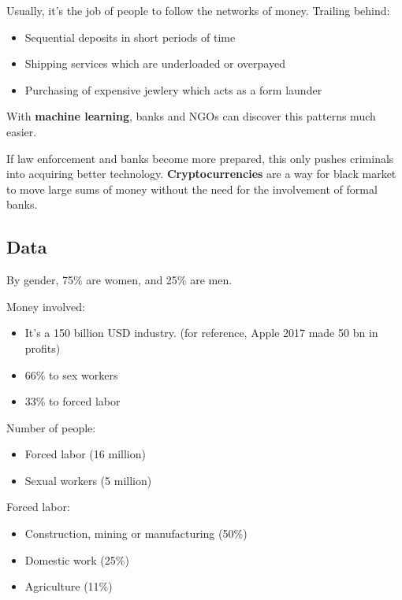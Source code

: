 	Usually, it's the job of people to follow the networks of money. Trailing behind:
	\begin{itemize}
		\item Sequential deposits in short periods of time
		\item Shipping services which are underloaded or overpayed
		\item Purchasing of expensive jewlery which acts as a form launder
	\end{itemize}

	With \textbf{machine learning}, banks and NGOs can discover this patterns much easier.

	If law enforcement and banks become more prepared, this only pushes criminals into acquiring better technology. \textbf{Cryptocurrencies} are a way for black market to move large sums of money without the need for the involvement of formal banks. 






\subsection{Data} 

	By gender, 75\% are women, and 25\% are men.

	Money involved:
	\begin{itemize}
		\item It's a 150 billion USD industry. (for reference, Apple 2017 made 50 bn in profits)
		\item  66\% to sex workers
		\item  33\% to forced labor
	\end{itemize}

	Number of people:
	\begin{itemize}
		\item Forced labor (16 million)
		\item Sexual workers (5 million)
	\end{itemize}

	Forced labor:
	\begin{itemize}
		\item Construction, mining or manufacturing (50\%)
		\item Domestic work (25\%)
		\item Agriculture (11\%)
	\end{itemize}





